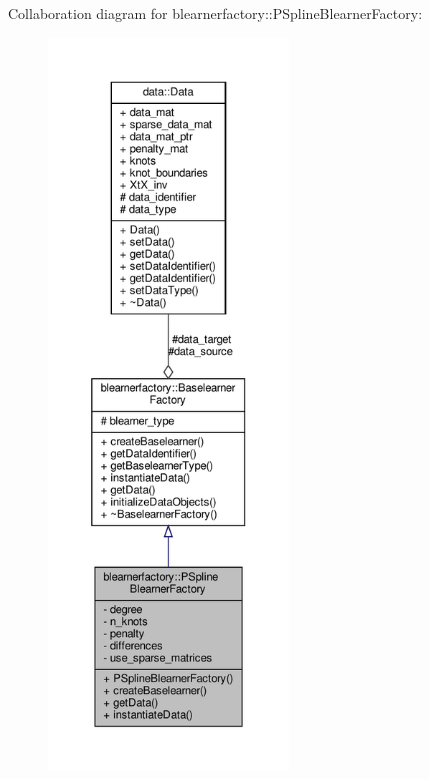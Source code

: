 Collaboration diagram for blearnerfactory\+:\+:P\+Spline\+Blearner\+Factory\+:\nopagebreak
\begin{figure}[H]
\begin{center}
\leavevmode
\includegraphics[height=550pt]{classblearnerfactory_1_1_p_spline_blearner_factory__coll__graph}
\end{center}
\end{figure}
